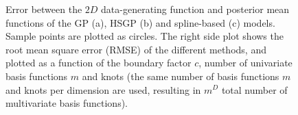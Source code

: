 \begin{figure}[h]
\hspace{1pt}
\hspace{-1.4cm} 
\caption{Error between the $2D$ data-generating function and posterior mean functions of the GP (a), HSGP (b) and spline-based (c) models. Sample points are plotted as circles. The right side plot shows the root mean square error (RMSE) of the different methods, and plotted as a function of the boundary factor $c$, number of univariate basis functions $m$ and knots (the same number of basis functions $m$ and knots per dimension are used, resulting in $m^D$ total number of multivariate basis functions).}
  \label{fig13_errors_exII}
\end{figure}
